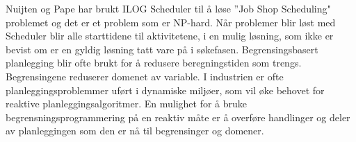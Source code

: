 Nuijten og Pape har brukt ILOG Scheduler til å løse ''Job Shop Scheduling" problemet  og det er et problem som er NP-hard. Når problemer blir løst med Scheduler blir alle starttidene til aktivitetene, i en mulig løsning, som ikke er bevist om er en gyldig løsning tatt vare på i søkefasen. Begrensingsbasert planlegging blir ofte brukt for å redusere beregningstiden som trengs. Begrensingene reduserer domenet av variable. I industrien er ofte planleggingsproblemmer uført i dynamiske miljøer, som vil øke behovet for reaktive planleggingsalgoritmer. En mulighet for å bruke begrensningsprogrammering på en reaktiv måte er å overføre handlinger og deler av planleggingen som den er nå til begrensinger og domener. \cite{Nuijten:1998:CJS:594934.594971}

\begin{comment}
\begin{itemize}
\item (Laborie) IBM ILOG CP Optimizer for Detailed Scheduling Illustrated in Three problems \cite{Laborie:2009:IIC:1560579.1560593}
\begin{itemize}
\item ...
\end{itemize}

\item (Biskup) Enslig-maskin planlegging med læringsbetraktninger %
\begin{itemize}
\item \dots
\end{itemize}

\end{itemize}
\end{comment}